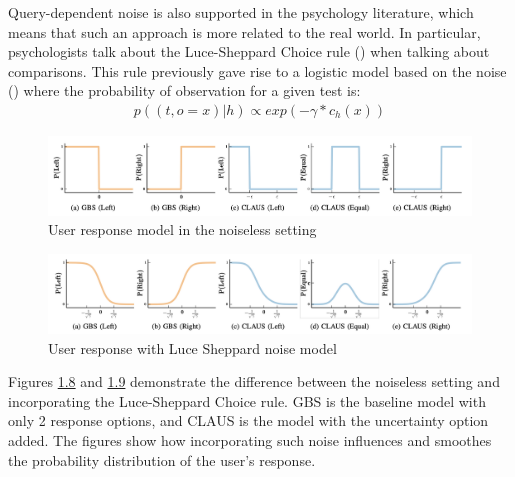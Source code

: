 \documentclass[
  letterpaper,
  DIV=11,
  numbers=noendperiod,
  oneside]{scrreprt}
\theoremstyle{remark}
\begin{document}
Query-dependent noise is also supported in the psychology literature,
which means that such an approach is more related to the real world. In
particular, psychologists talk about the Luce-Sheppard Choice rule
() when talking about comparisons.
This rule previously gave rise to a logistic model based on the noise
() where the
probability of observation for a given test is: \[\begin{aligned}
    p((t, o = x) | h) \propto exp(-\gamma * c_h(x))
    \label{eq:noise_model}
\end{aligned}\]

\begin{figure}

{\centering \includegraphics[width=1\textwidth,height=\textheight]{src/Figures/Noiseless probs.png}

}

\caption{User response model in the noiseless setting}

\end{figure}%
\begin{figure}

{\centering \includegraphics[width=1\textwidth,height=\textheight]{src/Figures/Noise probs.png}

}

\caption{User response with Luce Sheppard noise model}

\end{figure}%

Figures \hyperref[fig:noiseless_1]{1.8} and
\hyperref[fig:noiseless_2]{1.9} demonstrate the difference between the
noiseless setting and incorporating the Luce-Sheppard Choice rule. GBS
is the baseline model with only 2 response options, and CLAUS is the
model with the uncertainty option added. The figures show how
incorporating such noise influences and smoothes the probability
distribution of the user's response.
\end{document}
